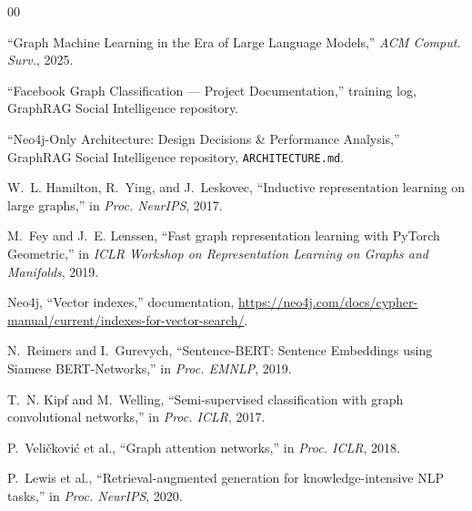 \documentclass[conference]{IEEEtran}
\begin{document}

\begin{thebibliography}{00}

``Graph Machine Learning in the Era of Large Language Models,'' \emph{ACM Comput. Surv.}, 2025.

``Facebook Graph Classification --- Project Documentation,'' training log, GraphRAG Social Intelligence repository.

``Neo4j-Only Architecture: Design Decisions \& Performance Analysis,'' GraphRAG Social Intelligence repository, \texttt{ARCHITECTURE.md}.

W.~L. Hamilton, R.~Ying, and J.~Leskovec, ``Inductive representation learning on large graphs,'' in \emph{Proc. NeurIPS}, 2017.

M.~Fey and J.~E. Lenssen, ``Fast graph representation learning with PyTorch Geometric,'' in \emph{ICLR Workshop on Representation Learning on Graphs and Manifolds}, 2019.

Neo4j, ``Vector indexes,'' documentation, \url{https://neo4j.com/docs/cypher-manual/current/indexes-for-vector-search/}.

N.~Reimers and I.~Gurevych, ``Sentence-BERT: Sentence Embeddings using Siamese BERT-Networks,'' in \emph{Proc. EMNLP}, 2019.

T.~N. Kipf and M.~Welling, ``Semi-supervised classification with graph convolutional networks,'' in \emph{Proc. ICLR}, 2017.

P.~Veli\v{c}kovi\'{c} et al., ``Graph attention networks,'' in \emph{Proc. ICLR}, 2018.

P.~Lewis et al., ``Retrieval-augmented generation for knowledge-intensive NLP tasks,'' in \emph{Proc. NeurIPS}, 2020.

\end{thebibliography}
\end{document}
